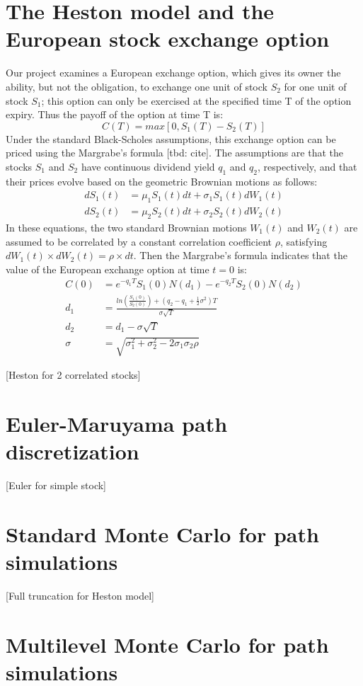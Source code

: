 \documentclass{article}
\begin{document}
\section{The Heston model and the European stock exchange option}
Our project examines a European exchange option, which gives its owner the ability, but not the obligation, to exchange one unit of stock $S_2$ for one unit of stock $S_1$; this option can only be exercised at the specified time T of the option expiry. Thus the payoff of the option at time T is: $$C(T)=max[0, S_1(T)-S_2(T)]$$
Under the standard Black-Scholes assumptions, this exchange option can be priced using the Margrabe's formula [tbd: cite]. The assumptions are that the stocks $S_1$ and $S_2$ have continuous dividend yield $q_1$ and $q_2$, respectively, and that their prices evolve based on the geometric Brownian motions as follows: 
\begin{align*}
dS_1(t) &= \mu_1 S_1(t) dt + \sigma_1 S_1(t) dW_1(t) \\
dS_2(t) &= \mu_2 S_2(t) dt + \sigma_2 S_2(t) dW_2(t)
\end{align*}
In these equations, the two standard Brownian motions $W_1(t)$ and $W_2(t)$ are assumed to be correlated by a constant correlation coefficient $\rho$, satisfying $dW_1(t) \times dW_2(t) = \rho \times dt$. Then the Margrabe's formula indicates that the value of the European exchange option at time $t=0$ is:
\begin{align*}
C(0) &= e^{-q_1 T} S_1(0) N(d_1) - e^{-q_2 T} S_2(0) N(d_2) \\
d_1 &= \frac{ln(\frac{S_1(0)}{S_2(0)}) + (q_2 - q_1 + \frac{1}{2} \sigma^2) T}{\sigma \sqrt{T}} \\
d_2 &= d_1 - \sigma \sqrt{T} \\
\sigma &= \sqrt{\sigma_1^2 + \sigma_2^2 - 2 \sigma_1 \sigma_2 \rho}
\end{align*}

[Heston for 2 correlated stocks]

\section{Euler-Maruyama path discretization}
[Euler for simple stock]

\section{Standard Monte Carlo for path simulations}
[Full truncation for Heston model]

\section{Multilevel Monte Carlo for path simulations}



\end{document}
